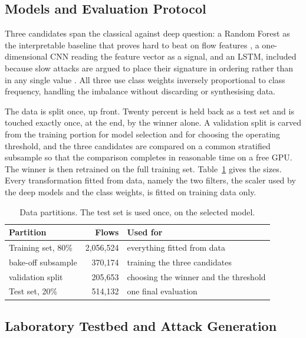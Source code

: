\documentclass[runningheads]{llncs}
\begin{document}
\subsection{Models and Evaluation Protocol}

Three candidates span the classical against deep question: a Random Forest as the interpretable baseline that proves hard to beat on flow features \cite{breiman2001random}, a one-dimensional CNN reading the feature vector as a signal, and an LSTM, included because slow attacks are argued to place their signature in ordering rather than in any single value \cite{hochreiter1997lstm,lecun2015deep}. All three use class weights inversely proportional to class frequency, handling the imbalance without discarding or synthesising data.

The data is split once, up front. Twenty percent is held back as a test set and is touched exactly once, at the end, by the winner alone. A validation split is carved from the training portion for model selection and for choosing the operating threshold, and the three candidates are compared on a common stratified subsample so that the comparison completes in reasonable time on a free GPU. The winner is then retrained on the full training set. Table~\ref{tab:protocol} gives the sizes. Every transformation fitted from data, namely the two filters, the scaler used by the deep models and the class weights, is fitted on training data only.

\begin{table}[t]
\centering
\caption{Data partitions. The test set is used once, on the selected model.}
\label{tab:protocol}
\begin{tabular}{lrl}
\toprule
\textbf{Partition} & \textbf{Flows} & \textbf{Used for} \\
\midrule
Training set, 80\%        & 2,056,524 & everything fitted from data \\
\quad bake-off subsample  & 370,174   & training the three candidates \\
\quad validation split    & 205,653   & choosing the winner and the threshold \\
Test set, 20\%            & 514,132   & one final evaluation \\
\bottomrule
\end{tabular}
\end{table}

\subsection{Laboratory Testbed and Attack Generation}
\end{document}
